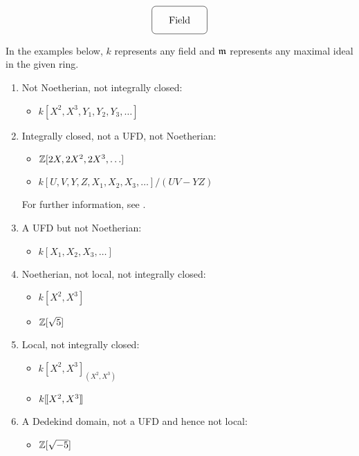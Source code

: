\documentclass{ximera}
\begin{document}
\[
\begin{tikzpicture}
\draw[rounded corners] (0,0) rectangle (2,1);
\node at (1,.5) {Field};
\end{tikzpicture}
\]


\newpage

\noindent In the examples below, $k$
represents any field and $\mathfrak{m}$ represents any maximal ideal in the
given ring.


\begin{enumerate}

\item Not Noetherian, not integrally closed:
\begin{itemize}
\item $k[X^2,X^3,Y_1,Y_2,Y_3,\ldots]$
\end{itemize}

\item Integrally closed, not a UFD, not Noetherian:
\begin{itemize}
\item $\mathbb Z[2X,2X^2,2X^3,\ldots]$
\item $k[U,V,Y,Z,X_1,X_2,X_3,\ldots]/(UV - YZ)$
\end{itemize}
For further information, see \cite{hH1981}.

\item A UFD but not Noetherian:
\begin{itemize}
\item $k[X_1,X_2,X_3,\ldots]$ 
\end{itemize}

\item Noetherian, not local, not integrally closed: 
\begin{itemize}
\item $k[X^2,X^3]$
\item $\mathbb Z[\sqrt{5}]$ 
\end{itemize}

\item Local, not integrally closed:
\begin{itemize}
\item $k[X^2,X^3]_{(X^2,X^3)}$
\item $k[\hspace{-0.25ex}[ X^2, X^3 ]\hspace{-0.25ex}]$
\end{itemize}


\item A Dedekind domain, not a UFD and hence not local: 
\begin{itemize}
\item $\mathbb Z[\sqrt{-5}]$
\end{itemize}


\end{enumerate}
\end{document}
